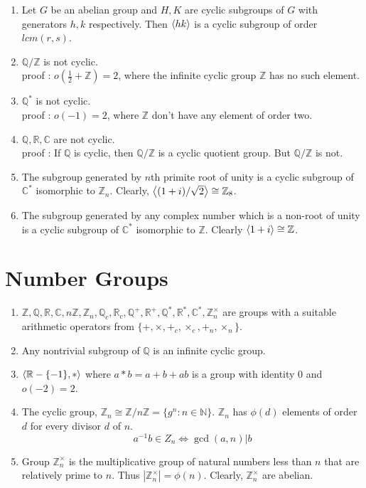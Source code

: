\begin{enumerate}
	\item Let $G$ be an abelian group and $H,K$ are cyclic subgroups of $G$ with generators $h,k$ respectively. Then $\left\langle hk \right\rangle$ is a cyclic subgroup of order $lcm(r,s)$.
	\item $\mathbb{Q}/\mathbb{Z}$ is not cyclic.\\
		proof : $o(\frac{1}{2} + \mathbb{Z}) = 2$, where the infinite cyclic group $\mathbb{Z}$ has no such element.
	\item $\mathbb{Q}^\ast$ is not cyclic.\\
		proof : $o(-1) = 2$, where $\mathbb{Z}$ don't have any element of order two.
	\item $\mathbb{Q},\mathbb{R},\mathbb{C}$ are not cyclic.\\
		proof : If $\mathbb{Q}$ is cyclic, then $\mathbb{Q}/\mathbb{Z}$ is a cyclic quotient group. But $\mathbb{Q}/\mathbb{Z}$ is not.
	\item The subgroup generated by $n$th primite root of unity is a cyclic subgroup of $\mathbb{C}^\ast$ isomorphic to $\mathbb{Z}_n$.
		Clearly, $\left\langle (1+i)/\sqrt{2} \right\rangle \cong \mathbb{Z}_8$.
	\item The subgroup generated by any complex number which is a non-root of unity is a cyclic subgroup of $\mathbb{C}^\ast$ isomorphic to $\mathbb{Z}$.
		Clearly $\left\langle 1+i \right\rangle \cong \mathbb{Z}$.
\end{enumerate}

\section{Number Groups}
\begin{enumerate}
	\item $\mathbb{Z},\mathbb{Q},\mathbb{R},\mathbb{C}, n\mathbb{Z}, \mathbb{Z}_n, \mathbb{Q}_c, \mathbb{R}_c, \mathbb{Q}^+, \mathbb{R}^+, \mathbb{Q}^\ast, \mathbb{R}^\ast, \mathbb{C}^\ast, \mathbb{Z}_n^\times$ are groups with a suitable arithmetic operators from $\{ +,\times,+_c,\times_c,+_n,\times_n\}$.
	\item Any nontrivial subgroup of $\mathbb{Q}$ is an infinite cyclic group.
	\item $\left\langle \mathbb{R}-\{-1\},\ast \right\rangle$ where $a \ast b = a+b+ab$ is a group with identity $0$ and $o(-2)=2$.
	\item The cyclic group, $\mathbb{Z}_n \cong \mathbb{Z}/n\mathbb{Z} = \{ g^n : n \in \mathbb{N}\}$. $\mathbb{Z}_n$ has $\phi(d)$ elements of order $d$ for every divisor $d$ of $n$.
	$$a^{-1}b \in Z_n \iff \gcd(a,n)|b$$
	\item Group $\mathbb{Z}_n^\times$ is the multiplicative group of natural numbers less than $n$ that are relatively prime to $n$. Thus $|\mathbb{Z}_n^\times| = \phi(n)$.
	Clearly, $\mathbb{Z}_n^\times$ are abelian.
\end{enumerate}

